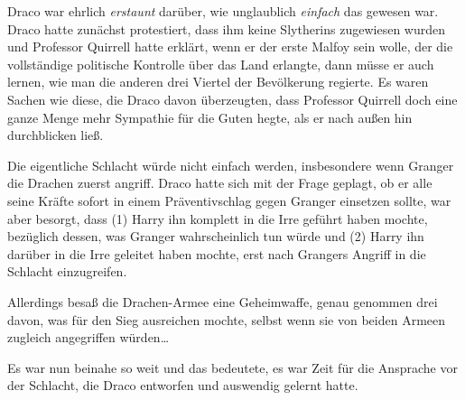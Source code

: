 Draco war ehrlich \emph{erstaunt} darüber, wie unglaublich \emph{einfach} das gewesen war. Draco hatte zunächst protestiert, dass ihm keine Slytherins zugewiesen wurden und Professor Quirrell hatte erklärt, wenn er der erste Malfoy sein wolle, der die vollständige politische Kontrolle über das Land erlangte, dann müsse er auch lernen, wie man die anderen drei Viertel der Bevölkerung regierte. Es waren Sachen wie diese, die Draco davon überzeugten, dass Professor Quirrell doch eine ganze Menge mehr Sympathie für die Guten hegte, als er nach außen hin durchblicken ließ.

Die eigentliche Schlacht würde nicht einfach werden, insbesondere wenn Granger die Drachen zuerst angriff. Draco hatte sich mit der Frage geplagt, ob er alle seine Kräfte sofort in einem Präventivschlag gegen Granger einsetzen sollte, war aber besorgt, dass (1) Harry ihn komplett in die Irre geführt haben mochte, bezüglich dessen, was Granger wahrscheinlich tun würde und (2) Harry ihn darüber in die Irre geleitet haben mochte, erst nach Grangers Angriff in die Schlacht einzugreifen.

Allerdings besaß die Drachen-Armee eine Geheimwaffe, genau genommen drei davon, was für den Sieg ausreichen mochte, selbst wenn sie von beiden Armeen zugleich angegriffen würden…

Es war nun beinahe so weit und das bedeutete, es war Zeit für die Ansprache vor der Schlacht, die Draco entworfen und auswendig gelernt hatte.


